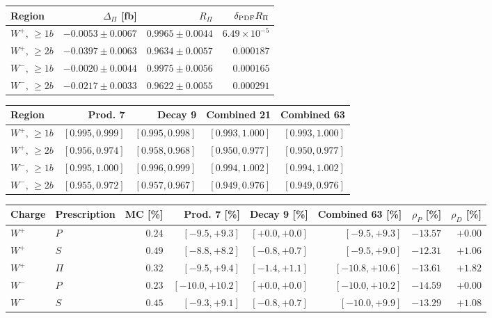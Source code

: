 \begin{table}[htbp]
\centering
\small
\setlength{\tabcolsep}{3pt}
\begin{tabular}{lrrr}
\toprule
Region & $\Delta_\Pi$ [fb] & $R_\Pi$ & $\delta_{\rm PDF}R_\Pi$ \\
\midrule
$W^{+},\,\geq1b$ & $-0.0053\pm0.0067$ & $0.9965\pm0.0044$ & $6.49\times10^{-5}$ \\
$W^{+},\,\geq2b$ & $-0.0397\pm0.0063$ & $0.9634\pm0.0057$ & $0.000187$ \\
$W^{-},\,\geq1b$ & $-0.0020\pm0.0044$ & $0.9975\pm0.0056$ & $0.000165$ \\
$W^{-},\,\geq2b$ & $-0.0217\pm0.0033$ & $0.9622\pm0.0055$ & $0.000291$ \\
\bottomrule
\end{tabular}
\par\medskip
\begin{tabular}{lrrrr}
\toprule
Region & Prod. 7 & Decay 9 & Combined 21 & Combined 63 \\
\midrule
$W^{+},\,\geq1b$ & $[0.995,0.999]$ & $[0.995,0.998]$ & $[0.993,1.000]$ & $[0.993,1.000]$ \\
$W^{+},\,\geq2b$ & $[0.956,0.974]$ & $[0.958,0.968]$ & $[0.950,0.977]$ & $[0.950,0.977]$ \\
$W^{-},\,\geq1b$ & $[0.995,1.000]$ & $[0.996,0.999]$ & $[0.994,1.002]$ & $[0.994,1.002]$ \\
$W^{-},\,\geq2b$ & $[0.955,0.972]$ & $[0.957,0.967]$ & $[0.949,0.976]$ & $[0.949,0.976]$ \\
\bottomrule
\end{tabular}
\par\medskip
\begin{tabular}{llrrrrrr}
\toprule
Charge & Prescription & MC [\%] & Prod. 7 [\%] & Decay 9 [\%] & Combined 63 [\%] & $\rho_P$ [\%] & $\rho_D$ [\%] \\
\midrule
$W^{+}$ & $P$ & $0.24$ & $[-9.5,+9.3]$ & $[+0.0,+0.0]$ & $[-9.5,+9.3]$ & $-13.57$ & $+0.00$ \\
$W^{+}$ & $S$ & $0.49$ & $[-8.8,+8.2]$ & $[-0.8,+0.7]$ & $[-9.5,+9.0]$ & $-12.31$ & $+1.06$ \\
$W^{+}$ & $\Pi$ & $0.32$ & $[-9.5,+9.4]$ & $[-1.4,+1.1]$ & $[-10.8,+10.6]$ & $-13.61$ & $+1.82$ \\
$W^{-}$ & $P$ & $0.23$ & $[-10.0,+10.2]$ & $[+0.0,+0.0]$ & $[-10.0,+10.2]$ & $-14.59$ & $+0.00$ \\
$W^{-}$ & $S$ & $0.45$ & $[-9.3,+9.1]$ & $[-0.8,+0.7]$ & $[-10.0,+9.9]$ & $-13.29$ & $+1.08$ \\

\end{tabular}
\end{table}
